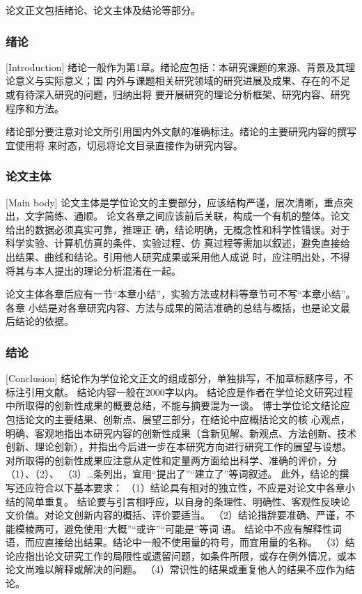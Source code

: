 论文正文包括绪论、论文主体及结论等部分。

\subsubsection{绪论}[Introduction]
绪论一般作为第1章。绪论应包括：本研究课题的来源、背景及其理论意义与实际意义；国
内外与课题相关研究领域的研究进展及成果、存在的不足或有待深入研究的问题，归纳出将
要开展研究的理论分析框架、研究内容、研究程序和方法。

绪论部分要注意对论文所引用国内外文献的准确标注。绪论的主要研究内容的撰写宜使用将
来时态，切忌将论文目录直接作为研究内容。

\subsubsection{论文主体}[Main body]
论文主体是学位论文的主要部分，应该结构严谨，层次清晰，重点突出，文字简练、通顺。
论文各章之间应该前后关联，构成一个有机的整体。论文给出的数据必须真实可靠，推理正
确，结论明确，无概念性和科学性错误。对于科学实验、计算机仿真的条件、实验过程、仿
真过程等需加以叙述，避免直接给出结果、曲线和结论。引用他人研究成果或采用他人成说
时，应注明出处，不得将其与本人提出的理论分析混淆在一起。

论文主体各章后应有一节“本章小结”，实验方法或材料等章节可不写“本章小结”。各章
小结是对各章研究内容、方法与成果的简洁准确的总结与概括，也是论文最后结论的依据。

\subsubsection{结论}[Conclusion]
结论作为学位论文正文的组成部分，单独排写，不加章标题序号，不标注引用文献。
结论内容一般在\num{2000}字以内。
结论应是作者在学位论文研究过程中所取得的创新性成果的概要总结，不能与摘要混为一谈。
博士学位论文结论应包括论文的主要结果、创新点、展望三部分，在结论中应概括论文的核
心观点，明确、客观地指出本研究内容的创新性成果（含新见解、新观点、方法创新、技术
创新、理论创新），并指出今后进一步在本研究方向进行研究工作的展望与设想。
对所取得的创新性成果应注意从定性和定量两方面给出科学、准确的评价，分（1）、（2）、
（3）…条列出，宜用“提出了”“建立了”等词叙述。
此外，结论的撰写还应符合以下基本要求：
（1）结论具有相对的独立性，不应是对论文中各章小结的简单重复。
结论要与引言相呼应，以自身的条理性、明确性、客观性反映论文价值。对论文创新内容的概括、评价要适当。
（2）结论措辞要准确、严谨，不能模棱两可，避免使用“大概”“或许”“可能是”等词
语。
结论中不应有解释性词语，而应直接给出结果。结论中一般不使用量的符号，而宜用量的名称。
（3）结论应指出论文研究工作的局限性或遗留问题，如条件所限，或存在例外情况，或本论文尚难以解释或解决的问题。
（4）常识性的结果或重复他人的结果不应作为结论。

